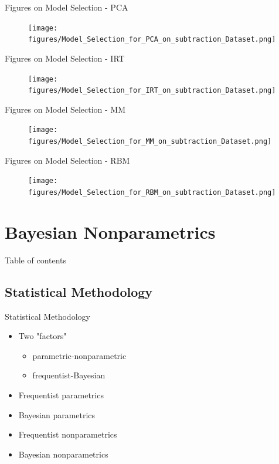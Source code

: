 \documentclass[handout]{beamer}
\begin{document}
\begin{frame}{Figures on Model Selection - PCA}
\begin{figure}[H]
\centering
	\texttt{[image: figures/Model\_Selection\_for\_PCA\_on\_subtraction\_Dataset.png]}
	\label{fig:PCA}
\end{figure}
\end{frame}

\begin{frame}{Figures on Model Selection - IRT}
\begin{figure}[H]
\centering
	\texttt{[image: figures/Model\_Selection\_for\_IRT\_on\_subtraction\_Dataset.png]}
	\label{fig:IRT}
\end{figure}
\end{frame}

\begin{frame}{Figures on Model Selection - MM}
\begin{figure}[H]
\centering
	\texttt{[image: figures/Model\_Selection\_for\_MM\_on\_subtraction\_Dataset.png]}
	\label{fig:MM}
\end{figure}
\end{frame}

\begin{frame}{Figures on Model Selection - RBM}
\begin{figure}[H]
\centering
	\texttt{[image: figures/Model\_Selection\_for\_RBM\_on\_subtraction\_Dataset.png]}
	\label{fig:RBM}
\end{figure}
\end{frame}


\section{Bayesian Nonparametrics}
\begin{frame}{Table of contents}
\begin{multicols}{2}
\end{multicols}
\end{frame}

\subsection{Statistical Methodology}
\begin{frame}{Statistical Methodology}
\begin{itemize}
\item{Two "factors"}
    \begin{itemize}
    \item{parametric-nonparametric}
    \item{frequentist-Bayesian}
    \end{itemize}
\item{Frequentist parametrics}
\item{Bayesian parametrics}
\item{Frequentist nonparametrics}
\item{Bayesian nonparametrics}
\end{itemize}
\end{frame}
\end{document}
